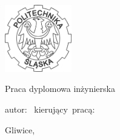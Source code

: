 \pagestyle{empty}
{
    \sffamily
    \rule{0cm}{0cm}

    \begin{center}
        \includegraphics[width=29mm]{assets/images/eps/polsl}
    \end{center}
    \vspace{1cm}
    \begin{center}
        \headerfont \polsl
    \end{center}
    \begin{center}
        \headerfont \wydzial
    \end{center}
    \vfill
    \begin{center}
        \titlefont Praca dyplomowa inżynierska
    \end{center}
    \vfill

    \begin{center}
        \otherfont \tytul\par
    \end{center}

    \vfill

    \vfill

    \noindent\vbox
    {
        \hbox{\otherfont autor: \autor}
        \vspace{12pt}
        \hbox{\otherfont kierujący pracą: \promotor}
    }
    \vfill

    \begin{center}
        \otherfont Gliwice,  \miesiac\ \the\year
    \end{center}
    \restoregeometry
}


\cleardoublepage


\rmfamily
\normalfont